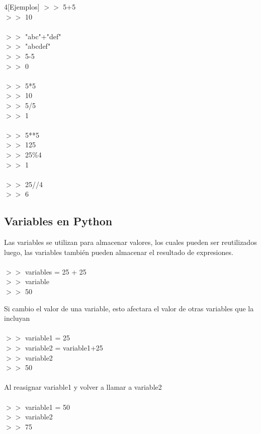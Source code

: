 \documentclass[10pt,a4paper]{article}
\begin{document}
\begin{multicols}{4}[Ejemplos]
\noindent
$>>$ 5+5\\
$>>$ 10\\~\\
$>>$ "abc"+"def"\\
\columnbreak
$>>$ "abcdef"\\
$>>$ 5-5\\
$>>$ 0\\~\\
$>>$ 5*5\\
\columnbreak
$>>$ 10\\
$>>$ 5/5\\
$>>$ 1\\~\\
$>>$ 5**5\\
\columnbreak
$>>$ 125\\
$>>$ 25\%4\\
$>>$ 1\\~\\
$>>$ 25//4\\
$>>$ 6
\end{multicols}


\subsection{Variables en Python}
Las variables se utilizan para almacenar valores, los cuales pueden ser reutilizados luego, las variables también pueden almacenar el resultado de expresiones.\\ \\
    \noindent
    $>>$ variables = 25 + 25\\
    $>>$ variable\\
    $>>$ 50

Si cambio el valor de una variable, esto afectara el valor de otras variables que la incluyan\\ \\
    \noindent
    $>>$ variable1 = 25\\
    $>>$ variable2 = variable1+25\\
    $>>$ variable2\\
    $>>$ 50\\ \\
    Al reasignar variable1 y volver a llamar a variable2\\ \\
    $>>$ variable1 = 50\\
    $>>$ variable2\\
    $>>$ 75
\end{document}
